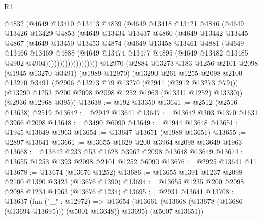\begin{lexlean}{R1}
\begin{coremodule}
                      @4832
                      (@4649
                        @13410
                        @13413
                        @4839
                        (@4649
                          @13418
                          @13421
                          @4846
                          (@4649
                            @13426
                            @13429
                            @4853
                            (@4649
                              @13434
                              @13437
                              @4860
                              (@4649
                                @13442
                                @13445
                                @4867
                                (@4649
                                  @13450
                                  @13453
                                  @4874
                                  (@4649
                                    @13458
                                    @13461
                                    @4881
                                    (@4649
                                      @13466
                                      @13469
                                      @4888
                                      (@4649
                                        @13474
                                        @13477
                                        @4895
                                        (@4649 @13482 @13485 @4902 @4904)))))))))))))))))))
    @12970
    (@2884
      @13273
      @183
      @1256
      @2101
      @2098
      (@1945 @13270 @3491)
      (@1989 @12970)
      (@13290
        @261
        @1255
        @2098
        @2100
        @13270
        @3491
        (@2906 @13273 @79 @13270 (@2911 (@2912 @13273 @79)))
        (@13290 @1253 @200 @2098 @2098 @1252 @1963 (@13311 @1252) @13330))
      (@2936 @12968 @395))
@13638 := @192 @13350
@13641 := @2512 (@2516 @13638) @2519
@13642 := @2942 @13641
@13647 := @13642 @303 @1370 @1631 @3966 @2098
@13648 := @3490 @6090
@13649 := @1944 @13648
@13651 := @1945 @13649 @1963
@13654 := @13647 @13651 (@1988 @13651)
@13655 := @2897 @13641
@13661 := @13655 @1629 @200 @3964 @2098 @13649 @1963
@13668 := @13642 @233 @53 @1628 @3962 @2098 @13648 @13649
@13674 := @13655 @1253 @1393 @2098 @2101 @1252 @6090
@13676 := @2925 @13641 @11
@13678 := @13674 (@13676 @1252)
@13686 := @13655 @1391 @1237 @2098 @2100 @1390 @3423 (@13676 @1390)
@13694 := @13655 @1235 @200 @2098 @2098 @1234 @1963 (@13676 @1234)
@13695 := @2931 @13641
@13708 := @13637
    (fun ("_" : @12972) =>
    @13654 (@13661 (@13668 (@13678 (@13686 (@13694 @13695))) (@5001 @13648)) @13695) (@5007 @13651))

\end{coremodule}
\end{lexlean}
